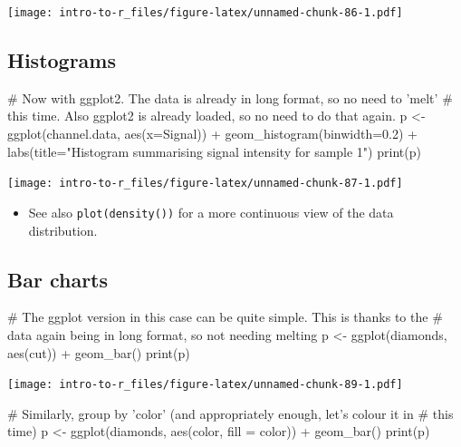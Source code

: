 \documentclass[a4paper]{book}
\newenvironment{Shaded}{}{}
\newcommand{\KeywordTok}[1]{\textcolor[rgb]{0.00,0.00,1.00}{{#1}}}
\newcommand{\DataTypeTok}[1]{{#1}}
\newcommand{\FloatTok}[1]{{#1}}
\newcommand{\StringTok}[1]{\textcolor[rgb]{0.00,0.50,0.50}{{#1}}}
\newcommand{\CommentTok}[1]{\textcolor[rgb]{0.00,0.50,0.00}{{#1}}}
\newcommand{\NormalTok}[1]{{#1}}
\newlength{\leftbarwidth}
\newlength{\leftbarsep}
\newcommand*{\leftbarcolorcmd}{\color{darkgray}}%
\renewenvironment{leftbar}{%
    \def\FrameCommand{{\leftbarcolorcmd{\vrule width \leftbarwidth\relax\hspace {\leftbarsep}}}}%
    \MakeFramed {\advance \hsize -\width \FrameRestore }%
}{%
    \endMakeFramed
}
\renewenvironment{Shaded}
{\vspace{0em}\begin{leftbar}\begin{snugshade}}
{\end{snugshade}\end{leftbar}\vspace{0pt}}
\newenvironment{rmdblock}[1]
  {\vspace{1.5em}\begin{shaded*}
  \begin{itemize}
  \renewcommand{\labelitemi}{
    \raisebox{-.7\height}[0pt][0pt]{
      {\setkeys{Gin}{width=3em,keepaspectratio}\texttt{[image: images/\#1]}}
    }
  }
  \item
  }
  {
  \end{itemize}
  \end{shaded*}
  }
\newenvironment{rmdtip}
  {\begin{rmdblock}{tip}}
  {\end{rmdblock}}
\begin{document}
\texttt{[image: intro-to-r\_files/figure-latex/unnamed-chunk-86-1.pdf]}

\subsection{Histograms}\label{histograms-1}

\begin{Shaded}
\begin{Highlighting}[]
\CommentTok{# Now with ggplot2. The data is already in long format, so no need to 'melt'}
\CommentTok{# this time. Also ggplot2 is already loaded, so no need to do that again.}
\NormalTok{p <-}\StringTok{ }\KeywordTok{ggplot}\NormalTok{(channel.data, }\KeywordTok{aes}\NormalTok{(}\DataTypeTok{x=}\NormalTok{Signal)) +}\StringTok{ }
\StringTok{  }\KeywordTok{geom_histogram}\NormalTok{(}\DataTypeTok{binwidth=}\FloatTok{0.2}\NormalTok{) +}
\StringTok{  }\KeywordTok{labs}\NormalTok{(}\DataTypeTok{title=}\StringTok{"Histogram summarising signal intensity for sample 1"}\NormalTok{)}
\KeywordTok{print}\NormalTok{(p)}
\end{Highlighting}
\end{Shaded}

\texttt{[image: intro-to-r\_files/figure-latex/unnamed-chunk-87-1.pdf]}

\begin{rmdtip}
See also \texttt{plot(density())} for a more continuous view of the data
distribution.
\end{rmdtip}

\subsection{Bar charts}\label{bar-charts-1}

\begin{Shaded}
\begin{Highlighting}[]
\CommentTok{# The ggplot version in this case can be quite simple. This is thanks to the}
\CommentTok{# data again being in long format, so not needing melting}
\NormalTok{p <-}\StringTok{ }\KeywordTok{ggplot}\NormalTok{(diamonds, }\KeywordTok{aes}\NormalTok{(cut)) +}\StringTok{ }\KeywordTok{geom_bar}\NormalTok{()}
\KeywordTok{print}\NormalTok{(p)}
\end{Highlighting}
\end{Shaded}

\texttt{[image: intro-to-r\_files/figure-latex/unnamed-chunk-89-1.pdf]}

\begin{Shaded}
\begin{Highlighting}[]
\CommentTok{# Similarly, group by 'color' (and appropriately enough, let's colour it in}
\CommentTok{# this time)}
\NormalTok{p <-}\StringTok{ }\KeywordTok{ggplot}\NormalTok{(diamonds, }\KeywordTok{aes}\NormalTok{(color, }\DataTypeTok{fill =} \NormalTok{color)) +}\StringTok{ }\KeywordTok{geom_bar}\NormalTok{()}
\KeywordTok{print}\NormalTok{(p)}
\end{Highlighting}
\end{Shaded}
\end{document}
